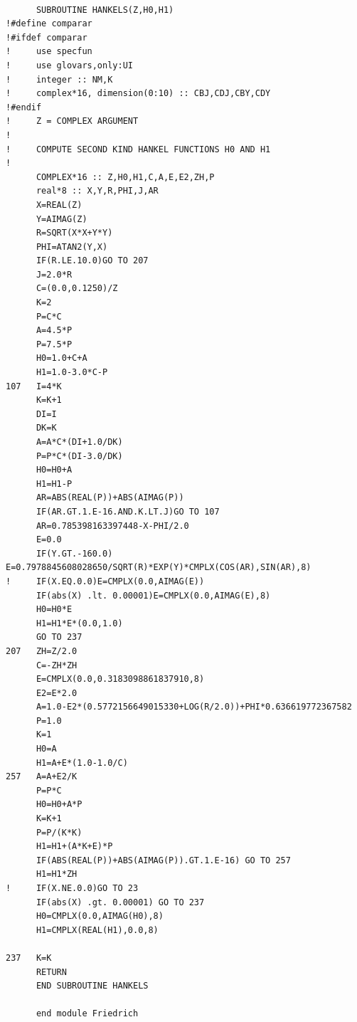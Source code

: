 \documentclass [11pt,spanish]{article}
\begin{document}
\begin{shaded}
\begin{verbatim}
      
      SUBROUTINE HANKELS(Z,H0,H1)
!#define comparar
!#ifdef comparar
!     use specfun
!     use glovars,only:UI
!     integer :: NM,K
!     complex*16, dimension(0:10) :: CBJ,CDJ,CBY,CDY
!#endif
!     Z = COMPLEX ARGUMENT
!
!     COMPUTE SECOND KIND HANKEL FUNCTIONS H0 AND H1
!
      COMPLEX*16 :: Z,H0,H1,C,A,E,E2,ZH,P
      real*8 :: X,Y,R,PHI,J,AR
      X=REAL(Z)
      Y=AIMAG(Z)
      R=SQRT(X*X+Y*Y)
      PHI=ATAN2(Y,X)
      IF(R.LE.10.0)GO TO 207
      J=2.0*R
      C=(0.0,0.1250)/Z
      K=2
      P=C*C
      A=4.5*P
      P=7.5*P
      H0=1.0+C+A
      H1=1.0-3.0*C-P
107   I=4*K
      K=K+1
      DI=I
      DK=K
      A=A*C*(DI+1.0/DK)
      P=P*C*(DI-3.0/DK)
      H0=H0+A
      H1=H1-P
      AR=ABS(REAL(P))+ABS(AIMAG(P))
      IF(AR.GT.1.E-16.AND.K.LT.J)GO TO 107
      AR=0.785398163397448-X-PHI/2.0
      E=0.0
      IF(Y.GT.-160.0) E=0.7978845608028650/SQRT(R)*EXP(Y)*CMPLX(COS(AR),SIN(AR),8)
!     IF(X.EQ.0.0)E=CMPLX(0.0,AIMAG(E))
      IF(abs(X) .lt. 0.00001)E=CMPLX(0.0,AIMAG(E),8)
      H0=H0*E
      H1=H1*E*(0.0,1.0)
      GO TO 237
207   ZH=Z/2.0
      C=-ZH*ZH
      E=CMPLX(0.0,0.3183098861837910,8)
      E2=E*2.0
      A=1.0-E2*(0.5772156649015330+LOG(R/2.0))+PHI*0.636619772367582
      P=1.0
      K=1
      H0=A
      H1=A+E*(1.0-1.0/C)
257   A=A+E2/K
      P=P*C
      H0=H0+A*P
      K=K+1
      P=P/(K*K)
      H1=H1+(A*K+E)*P
      IF(ABS(REAL(P))+ABS(AIMAG(P)).GT.1.E-16) GO TO 257
      H1=H1*ZH
!     IF(X.NE.0.0)GO TO 23
      IF(abs(X) .gt. 0.00001) GO TO 237
      H0=CMPLX(0.0,AIMAG(H0),8)
      H1=CMPLX(REAL(H1),0.0,8)

237   K=K     
      RETURN
      END SUBROUTINE HANKELS
      
      end module Friedrich
\end{verbatim}
\end{shaded}
\endgroup
\end{document}
